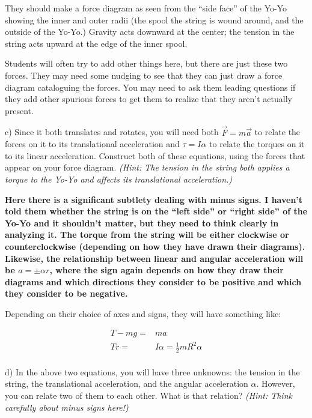 \documentclass[12pt]{article}
\begin{document}
{\color{red}They should make a force diagram as seen from the ``side face'' of the Yo-Yo showing the inner and outer radii (the spool the string is wound around, and the outside of the Yo-Yo.) Gravity acts downward at the center; the tension in the string acts upward at the edge of the inner spool.}

{\color{blue} Students will often try to add other things here, but there are just these two forces. They may need some nudging to see that they can just draw a force diagram cataloguing the forces. You may need to ask them leading questions if they add other spurious forces to get them to realize that they aren't actually present.}



c) Since it both translates and rotates, you will need both $\vec F = m \vec a$ to relate the forces on it to its translational acceleration and $\tau = I \alpha$ to relate the torques on it to its linear acceleration. Construct both of these equations, using the forces that appear on your force diagram. \textit{(Hint: The tension in the string both applies a torque to the Yo-Yo and affects its translational acceleration.)}

{\color{blue} \bf Here there is a significant subtlety dealing with minus signs. \rm I haven't told them whether the string is on the ``left side'' or ``right side'' of the Yo-Yo and it shouldn't matter, but they need to think clearly in analyzing it. The torque from the string will be either clockwise or counterclockwise (depending on how they have drawn their diagrams). Likewise, the relationship between linear and angular acceleration will be $a = \pm \alpha r$, where the sign again depends on how they draw their diagrams and which directions they consider to be positive and which they consider to be negative.}

{\color{red}
	
	Depending on their choice of axes and signs, they will have something like:
	
	\begin{align*}
		T - mg =& ma \\
		Tr =& I \alpha = \frac{1}{2}mR^2 \alpha \\
		\end{align*}
	
}


d) In the above two equations, you will have three unknowns: the tension in the string, the translational acceleration, and the angular acceleration $\alpha$. However, you can relate two of them to each other. What is that relation? \textit{(Hint: Think carefully about minus signs here!)}
\end{document}
